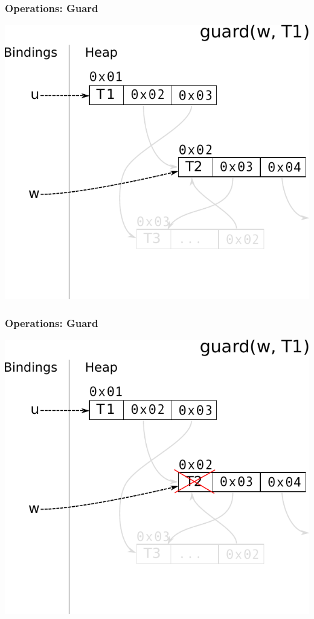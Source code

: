 \documentclass[utf8x]{beamer}
\begin{document}
\begin{frame}[plain]
  \frametitle{Operations: Guard}
  \includegraphics[scale=0.8]{figures/guard03}
\end{frame}

\begin{frame}[plain]
  \frametitle{Operations: Guard}
  \includegraphics[scale=0.8]{figures/guard04}
\end{frame}
\end{document}
